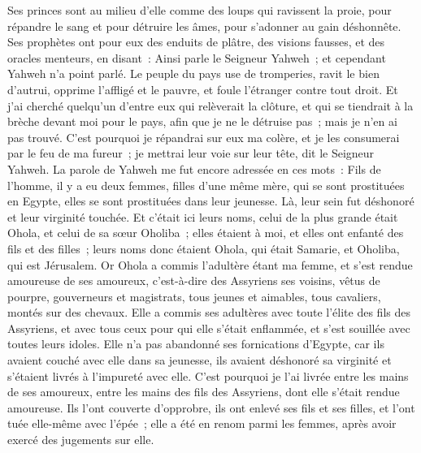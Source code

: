 \begin{multicols}{2}
Ses princes sont au milieu d'elle comme des loups qui ravissent la proie, pour répandre le sang et pour détruire les âmes, pour s'adonner au gain déshonnête.
Ses prophètes ont pour eux des enduits de plâtre, des visions fausses, et des oracles menteurs, en disant~: Ainsi parle le Seigneur Yahweh~; et cependant Yahweh n'a point parlé.
Le peuple du pays use de tromperies, ravit le bien d'autrui, opprime l'affligé et le pauvre, et foule l'étranger contre tout droit.
Et j'ai cherché quelqu'un d'entre eux qui relèverait la clôture, et qui se tiendrait à la brèche devant moi pour le pays, afin que je ne le détruise pas~; mais je n'en ai pas trouvé. 
C'est pourquoi je répandrai sur eux ma colère, et je les consumerai par le feu de ma fureur~; je mettrai leur voie sur leur tête, dit le Seigneur Yahweh.
\VerseOne{}La parole de Yahweh me fut encore adressée en ces mots~:
Fils de l'homme, il y a eu deux femmes, filles d'une même mère,
qui se sont prostituées en Egypte, elles se sont prostituées dans leur jeunesse. Là, leur sein fut déshonoré et leur virginité touchée.
Et c'était ici leurs noms, celui de la plus grande était Ohola, et celui de sa sœur Oholiba~; elles étaient à moi, et elles ont enfanté des fils et des filles~; leurs noms donc étaient Ohola, qui était Samarie, et Oholiba, qui est Jérusalem.
Or Ohola a commis l'adultère étant ma femme, et s'est rendue amoureuse de ses amoureux, c'est-à-dire des Assyriens ses voisins,
vêtus de pourpre, gouverneurs et magistrats, tous jeunes et aimables, tous cavaliers, montés sur des chevaux.
Elle a commis ses adultères avec toute l'élite des fils des Assyriens, et avec tous ceux pour qui elle s'était enflammée, et s'est souillée avec toutes leurs idoles.
Elle n'a pas abandonné ses fornications d'Egypte, car ils avaient couché avec elle dans sa jeunesse, ils avaient déshonoré sa virginité et s'étaient livrés à l'impureté avec elle.
C'est pourquoi je l'ai livrée entre les mains de ses amoureux, entre les mains des fils des Assyriens, dont elle s'était rendue amoureuse.
Ils l'ont couverte d'opprobre, ils ont enlevé ses fils et ses filles, et l'ont tuée elle-même avec l'épée~; elle a été en renom parmi les femmes, après avoir exercé des jugements sur elle.

\end{multicols}

